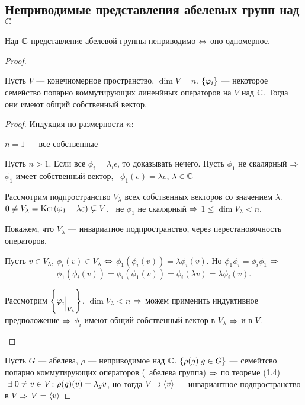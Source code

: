 \subsection{Неприводимые представления абелевых групп над $\mathbb{C}$}
\begin{theorem}
	Над $\mathbb{C}$ представление абелевой группы неприводимо $\Leftrightarrow$
	оно одномерное.
\end{theorem}
\begin{proof}
	\begin{theorem}
		Пусть $V$ --- конечномерное пространство, $\dim V = n$.
		$\left\{\varphi_i\right\}$ --- некоторое семейство попарно коммутирующих линенйных
		операторов на $V$ над $\mathbb{C}$.
		Тогда они имеют общий собственный вектор.
	\end{theorem}
	\begin{proof}
		Индукция по размерности $n$:
		\begin{points}{-3}
			\item $n = 1$ --- все собственные
			\item Пусть $n > 1$. Если все $\phi_i = \lambda_i \epsilon$, то доказывать нечего.
				Пусть $\phi_1$ не скалярный $\Rightarrow$
				$\phi_1$ имеет собственный вектор, \ie\
				$\phi_1(e) = \lambda e$, $\lambda \in \mathbb{C}$

				Рассмотрим подпространство $V_{\lambda}$ всех собственных векторов
					со значением $\lambda$.
				$0 \ne V_{\lambda} = \operatorname{Ker} (\varphi_1 - \lambda \varepsilon) \varsubsetneq V$, \bt\
				не $\phi_1$ не скалярный $\Rightarrow$ $1 \le \dim V_{\lambda} < n$.

				Покажем, что $V_{\lambda}$ --- инвариатное подпространство, через перестановочность операторов.

				Пусть $v \in V_{\lambda}$, $\phi_i(v) \in V_{\lambda}$ $\Leftrightarrow$
				$\phi_1(\phi_i(v)) = \lambda \phi_i(v)$.
				Но $\phi_1 \phi_i = \phi_i \phi_1$ $\Rightarrow$
				$$
					\phi_1(\phi_i(v)) = \phi_i(\phi_1(v)) = 
					\phi_i(\lambda v ) = \lambda \phi_i(v).
				$$

				Рассмотрим $\hc{\phi_i\evn{V_{\lambda}}}$, $\dim V_{\lambda} < n$ $\Rightarrow$
				можем применить индуктивное предположение $\Rightarrow$
				$\phi_i$ имеют общий собственный вектор в $V_{\lambda}$ $\Rightarrow$ и в $V$.
		\end{points}
	\end{proof}

	Пусть $G$ --- абелева, $\rho$ --- неприводимое над $\mathbb{C}$.
	$\left\{\rho(g) | g \in G\right\}$ --- семейтсво попарно коммутирующих операторов (\bt\ абелева группа) $\Rightarrow$
	по теореме (1.4) $~\exists\; 0 \ne v \in V \colon \rho(g)(v) = \lambda_g v$,
	но тогда $V \supset \left\langle v\right\rangle$ --- инвариантное подпространство в $V$ $\Rightarrow$ $V = \left\langle v\right\rangle$
\end{proof}

